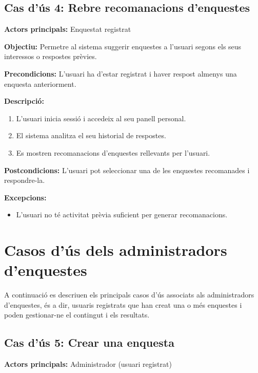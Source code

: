 \documentclass[../main.tex]{subfiles}
\begin{document}
\subsection*{Cas d’ús 4: Rebre recomanacions d’enquestes}

\textbf{Actors principals:} Enquestat registrat

\textbf{Objectiu:} Permetre al sistema suggerir enquestes a l’usuari segons els seus interessos o respostes prèvies.

\textbf{Precondicions:}  
L’usuari ha d’estar registrat i haver respost almenys una enquesta anteriorment.

\textbf{Descripció:}
\begin{enumerate}
    \item L’usuari inicia sessió i accedeix al seu panell personal.
    \item El sistema analitza el seu historial de respostes.
    \item Es mostren recomanacions d’enquestes rellevants per l'usuari.
\end{enumerate}

\textbf{Postcondicions:}  
L’usuari pot seleccionar una de les enquestes recomanades i respondre-la.

\textbf{Excepcions:}
\begin{itemize}
    \item L’usuari no té activitat prèvia suficient per generar recomanacions.
\end{itemize}





\section{Casos d’ús dels administradors d’enquestes}

A continuació es descriuen els principals casos d’ús associats als administradors d’enquestes,
és a dir, usuaris registrats que han creat una o més enquestes i poden gestionar-ne el contingut i els resultats.


\subsection*{Cas d’ús 5: Crear una enquesta}

\textbf{Actors principals:} Administrador (usuari registrat)
\end{document}
